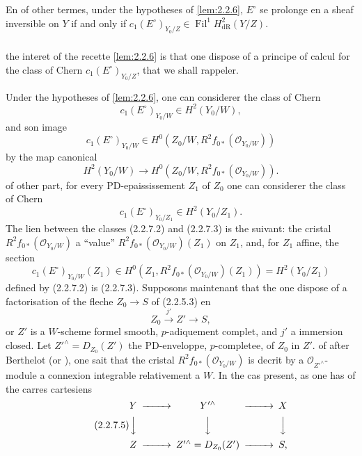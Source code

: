 \documentclass[12pt,a4paper]{article}
\theoremstyle{plain}
\theoremstyle{definition}
\theoremstyle{remark}
\DeclareMathOperator{\Fil}{Fil}
\begin{document}
En of other termes, under the hypotheses of \ref{lem:2.2.6}, $E^\circ$ se prolonge en a sheaf inversible on $Y$ if and only if $c_1(E^\circ)_{Y_0/Z} \in \Fil^1 H^2_\mathrm{dR}(Y/Z)$.

\subsubsection{}
the interet of the recette \ref{lem:2.2.6} is that one dispose of a principe of calcul for the class of Chern $c_1(E^\circ)_{Y_0/Z}$, that we shall rappeler.

Under the hypotheses of \ref{lem:2.2.6}, one can considerer the class of Chern
\begin{equation}\tag{2.2.7.1}
c_1(E^\circ)_{Y_0/W} \in H^2(Y_0/W), 
\end{equation}
and son image
\begin{equation}\tag{2.2.7.2}
c_1(E^\circ)_{Y_0/W} \in H^0(Z_0/W, R^2f_{0*}(\mathcal{O}_{Y_0/W})) 
\end{equation}
by the map canonical
\[
H^2(Y_0/W) \longrightarrow H^0(Z_0/W, R^2f_{0*}(\mathcal{O}_{Y_0/W})).
\]
of other part, for every PD-epaississement $Z_1$ of $Z_0$ one can considerer the class of Chern
\begin{equation}\tag{2.2.7.3}
c_1(E^\circ)_{Y_0/Z_1} \in H^2(Y_0/Z_1). 
\end{equation}
The lien between the classes (2.2.7.2) and (2.2.7.3) is the suivant: the cristal $R^2f_{0*}(\mathcal{O}_{Y_0/W})$ a ``value'' $R^2f_{0*}(\mathcal{O}_{Y_0/W})(Z_1)$ on $Z_1$, and, for $Z_1$ affine, the section
\[
c_1(E^\circ)_{Y_0/W}(Z_1) \in H^0(Z_1, R^2f_{0*}(\mathcal{O}_{Y_0/W})(Z_1)) = H^2(Y_0/Z_1)
\]
defined by (2.2.7.2) is (2.2.7.3). Supposons maintenant that the one dispose of a factorisation of the fleche $Z_0 \to S$ of (2.2.5.3) en
\begin{equation}\tag{2.2.7.4}
Z_0 \xrightarrow{j'} Z' \longrightarrow S, 
\end{equation}
or $Z'$ is a $W$-scheme formel smooth, $p$-adiquement complet, and $j'$ a immersion closed. Let $Z'^\wedge = D_{Z_0}(Z')$ the PD-enveloppe, $p$-completee, of $Z_0$ in $Z'$. of after Berthelot \cite{Berthelot} (or \cite[\S 7]{BerthelotOgus}), one sait that the cristal $R^2f_{0*}(\mathcal{O}_{Y_0/W})$ is decrit by a $\mathcal{O}_{Z'^\wedge}$-module a connexion integrable relativement a $W$. In the cas present, as one has of the carres cartesiens
\begin{equation}\tag{2.2.7.5}
\begin{CD}
Y @>>> Y'^\wedge @>>> X \\
@VVV @VVV @VVV \\
Z @>>> Z'^\wedge = D_{Z_0}(Z') @>>> S,
\end{CD} 
\end{equation}
\end{document}
